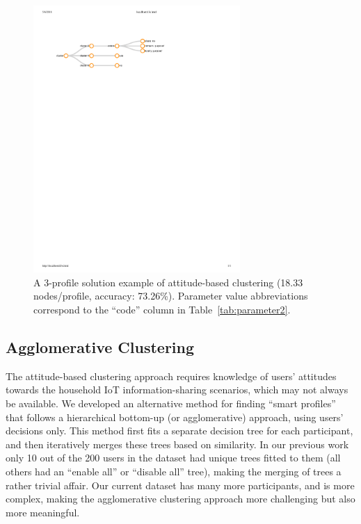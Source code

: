 \begin{figure}
	\centering
	\includegraphics[width=0.7\textwidth]{figures/attitude_3_profile.pdf}
	\caption{A 3-profile solution example of attitude-based clustering (18.33 nodes/profile, accuracy: 73.26\%). Parameter value abbreviations correspond to the ``code'' column in Table~\ref{tab:parameter2}.}
	\label{fig:attitude_3profile}
\end{figure}

\subsection{Agglomerative Clustering}
The attitude-based clustering approach requires knowledge of users' attitudes towards the household IoT information-sharing scenarios, which may not always be available. We developed an alternative method for finding ``smart profiles'' that follows a hierarchical bottom-up (or agglomerative) approach, using users' decisions only. This method first fits a separate decision tree for each participant, and then iteratively merges these trees based on similarity. In our previous work~\cite{bahiratiui2018} only 10 out of the 200 users in the dataset had unique trees fitted to them (all others had an ``enable all'' or ``disable all'' tree), making the merging of trees a rather trivial affair. Our current dataset has many more participants, and is more complex, making the agglomerative clustering approach more challenging but also more meaningful. 


